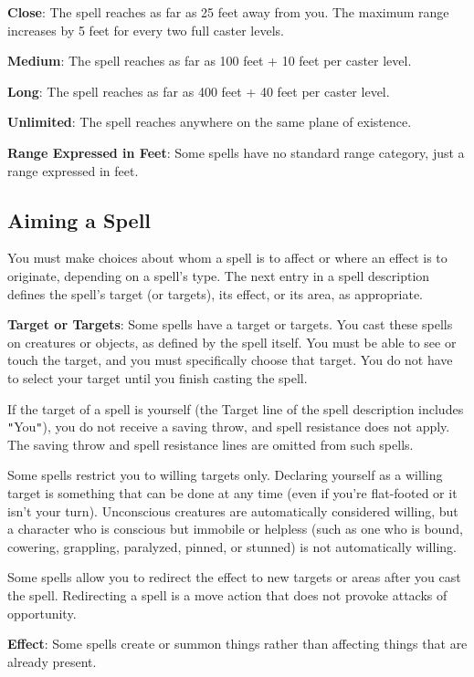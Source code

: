 \textbf{Close}: The spell reaches as far as 25 feet away from you. The maximum range increases by 5 feet for every two full caster levels.
				
\textbf{Medium}: The spell reaches as far as 100 feet + 10 feet per caster level.
				
\textbf{Long}: The spell reaches as far as 400 feet + 40 feet per caster level.
				
\textbf{Unlimited}: The spell reaches anywhere on the same plane of existence.
				
\textbf{Range Expressed in Feet}: Some spells have no standard range category, just a range expressed in feet.
				
\subsection{Aiming a Spell}

				
You must make choices about whom a spell is to affect or where an effect is to originate, depending on a spell's type. The next entry in a spell description defines the spell's target (or targets), its effect, or its area, as appropriate.
				
\textbf{Target or Targets}: Some spells have a target or targets. You cast these spells on creatures or objects, as defined by the spell itself. You must be able to see or touch the target, and you must specifically choose that target. You do not have to select your target until you finish casting the spell.
				
If the target of a spell is yourself (the Target line of the spell description includes \texttt{{}"{}}You\texttt{{}"{}}), you do not receive a saving throw, and spell resistance does not apply. The saving throw and spell resistance lines are omitted from such spells.
				
Some spells restrict you to willing targets only. Declaring yourself as a willing target is something that can be done at any time (even if you're flat-footed or it isn't your turn). Unconscious creatures are automatically considered willing, but a character who is conscious but immobile or helpless (such as one who is bound, cowering, grappling, paralyzed, pinned, or stunned) is not automatically willing.
				
Some spells allow you to redirect the effect to new targets or areas after you cast the spell. Redirecting a spell is a move action that does not provoke attacks of opportunity.
				
\textbf{Effect}: Some spells create or summon things rather than affecting things that are already present.
				
